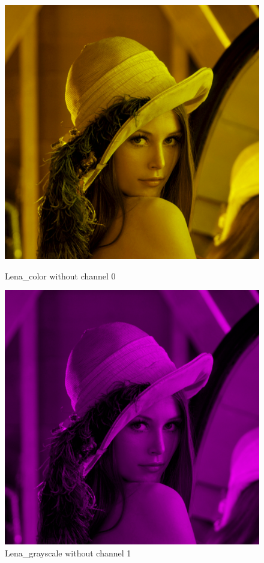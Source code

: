 \begin{figure}[h]
	\centering
	\begin{minipage}{0.45\textwidth}
		\centering
		\includegraphics[width=\linewidth]{images/source/task3/1}
		\caption{Lena\_color without channel 0}
		\label{fig:1a}
        \end{minipage}
        \hspace{0.05\textwidth}
        \begin{minipage}{0.45\textwidth}
        		\centering
		\includegraphics[width=\linewidth]{images/source/task3/2}
		\caption{Lena\_grayscale without channel 1}
		\label{fig:1b}
        \end{minipage}
\end{figure}

